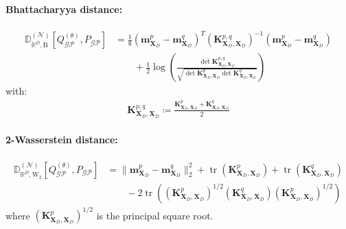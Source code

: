 \documentclass{article}
\newcommand{\tr}{\operatorname{tr}}
\newcommand{\GP}{\operatorname{\mathcal{GP}}}
\numberwithin{equation}{section}
\begin{document}
\paragraph{Bhattacharyya distance:} 
\begin{align}
    \mathbb{D}_{\mathbb{R}^D, \text{B}}^{(\mathcal{N})} \left[Q_{\GP}^{(\theta)}, P_{\GP}\right] &= \frac{1}{8}\left(\mathbf{m}_{\mathbf{X}_D}^p - \mathbf{m}_{\mathbf{X}_D}^q\right)^T \left(\mathbf{K}_{\mathbf{X}_D, \mathbf{X}_D}^{p, q}\right)^{-1}\left(\mathbf{m}_{\mathbf{X}_D}^p - \mathbf{m}_{\mathbf{X}_D}^q\right) \nonumber
    \\ &\qquad + \frac{1}{2} \log\left(\frac{\det\mathbf{K}_{\mathbf{X}_D, \mathbf{X}_D}^{p, q}}{\sqrt{\det\mathbf{K}_{\mathbf{X}_D, \mathbf{X}_D}^{p}\det\mathbf{K}_{\mathbf{X}_D, \mathbf{X}_D}^{q}}}\right)
\end{align}
with:
\begin{align}
    \mathbf{K}_{\mathbf{X}_D, \mathbf{X}_D}^{p, q} \coloneqq \frac{\mathbf{K}_{\mathbf{X}_D, \mathbf{X}_D}^{p} + \mathbf{K}_{\mathbf{X}_D, \mathbf{X}_D}^{q}}{2}
\end{align}

\paragraph{2-Wasserstein distance:} 
\begin{align}
    \mathbb{D}_{\mathbb{R}^D, \text{W}_2}^{(\mathcal{N})} \left[Q_{\GP}^{(\theta)}, P_{\GP}\right] &= \|\mathbf{m}_{\mathbf{X}_D}^p - \mathbf{m}_{\mathbf{X}_D}^q\|_2^2 + \tr \left(\mathbf{K}_{\mathbf{X}_D, \mathbf{X}_D}^p\right) + \tr \left(\mathbf{K}_{\mathbf{X}_D, \mathbf{X}_D}^q\right) \nonumber \\
    & \qquad - 2 \tr\left(\left(\mathbf{K}_{\mathbf{X}_D, \mathbf{X}_D}^p\right)^{1/2}\left(\mathbf{K}_{\mathbf{X}_D, \mathbf{X}_D}^q\right)\left(\mathbf{K}_{\mathbf{X}_D, \mathbf{X}_D}^p\right)^{1/2}\right) 
\end{align}
where $\left(\mathbf{K}_{\mathbf{X}_D, \mathbf{X}_D}^p\right)^{1/2}$ is the principal square root.
\end{document}
